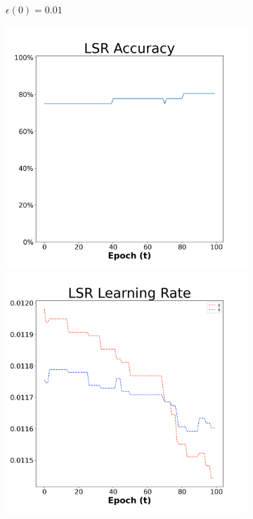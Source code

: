 \begin{figure}[H]
\begin{subfigure}{0.3\textwidth}
  \caption{$\epsilon(0)=0.01$}
\end{subfigure}\hfil %
\begin{subfigure}{0.3\textwidth}
  \includegraphics[width=\linewidth]{images/exper1/Ionosphere/LSR_0.03_acc.png}
  \includegraphics[width=\linewidth]{images/exper1/Ionosphere/LSR_0.03_lr.png}

\end{subfigure}
\end{figure}
